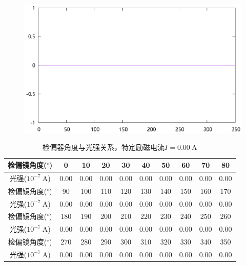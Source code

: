 \documentclass{ctexart}
\newcommand{\si}[1]{\  \mathrm{#1}}
\begin{document}
    \begin{figure}[H]
      \centering
      \includegraphics[width=\linewidth]{../output/analyzer-angle-light-intensity-6.gnuplot}
    \end{figure}
\newpage
\begin{table}[H]
      \centering
      \begin{tabular}{|c|c|c|c|c|c|c|c|c|c|}
        \hline
        检偏镜角度(${}^{\circ}$) & 0 & 10 & 20 & 30 & 40 & 50 & 60 & 70 & 80 \\\hline
        光强($10^{-7} \si{A}$)  & 0.00 & 0.00 & 0.00 & 0.00 & 0.00 & 0.00 & 0.00 & 0.00 & 0.00 \\\hline
        检偏镜角度(${}^{\circ}$) & 90 & 100 & 110 & 120 & 130 & 140 & 150 & 160 & 170 \\\hline
        光强($10^{-7} \si{A}$)  & 0.00 & 0.00 & 0.00 & 0.00 & 0.00 & 0.00 & 0.00 & 0.00 & 0.00  \\\hline
        检偏镜角度(${}^{\circ}$) & 180 & 190 & 200 & 210 & 220 & 230 & 240 & 250 & 260  \\\hline
        光强($10^{-7} \si{A}$)  & 0.00 & 0.00 & 0.00 & 0.00 & 0.00 & 0.00 & 0.00 & 0.00 & 0.00 \\\hline
        检偏镜角度(${}^{\circ}$) & 270 & 280 & 290 & 300 & 310 & 320 & 330 & 340 & 350 \\\hline
        光强($10^{-7} \si{A}$)  & 0.00 & 0.00 & 0.00 & 0.00 & 0.00 & 0.00 & 0.00 & 0.00 & 0.00 \\\hline
      \end{tabular}
      \caption{检偏器角度与光强关系，特定励磁电流$I=0.00 \si{A}$}
    \end{table}
\end{document}
